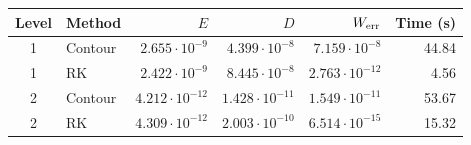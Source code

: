 \begin{tabular}{clrrrr}
\toprule
Level & Method & $E$ & $D$ & $W_{\rm err}$ & Time (s)\\
\midrule
1 & Contour & $2.655\cdot10^{-9}$ & $4.399\cdot10^{-8}$ & $7.159\cdot10^{-8}$ & 44.84\\
1 & RK & $2.422\cdot10^{-9}$ & $8.445\cdot10^{-8}$ & $2.763\cdot10^{-12}$ & 4.56\\
2 & Contour & $4.212\cdot10^{-12}$ & $1.428\cdot10^{-11}$ & $1.549\cdot10^{-11}$ & 53.67\\
2 & RK & $4.309\cdot10^{-12}$ & $2.003\cdot10^{-10}$ & $6.514\cdot10^{-15}$ & 15.32\\
\bottomrule
\end{tabular}

